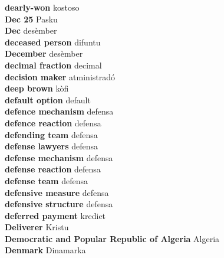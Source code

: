 \textbf{ dearly-won  } kostoso \\
\textbf{ Dec 25  } Pasku \\
\textbf{ Dec  } desèmber \\
\textbf{ deceased person  } difuntu \\
\textbf{ December  } desèmber \\
\textbf{ decimal fraction  } decimal \\
\textbf{ decision maker  } atministradó \\
\textbf{ deep brown  } kòfi \\
\textbf{ default option  } default \\
\textbf{ defence mechanism  } defensa \\
\textbf{ defence reaction  } defensa \\
\textbf{ defending team  } defensa \\
\textbf{ defense lawyers  } defensa \\
\textbf{ defense mechanism  } defensa \\
\textbf{ defense reaction  } defensa \\
\textbf{ defense team  } defensa \\
\textbf{ defensive measure  } defensa \\
\textbf{ defensive structure  } defensa \\
\textbf{ deferred payment  } krediet \\
\textbf{ Deliverer  } Kristu \\
\textbf{ Democratic and Popular Republic of Algeria  } Algeria \\
\textbf{ Denmark  } Dinamarka \\
